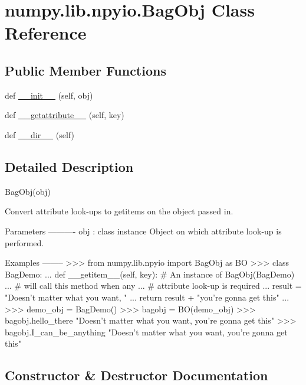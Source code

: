 \hypertarget{classnumpy_1_1lib_1_1npyio_1_1BagObj}{}\section{numpy.\+lib.\+npyio.\+Bag\+Obj Class Reference}
\label{classnumpy_1_1lib_1_1npyio_1_1BagObj}
\subsection*{Public Member Functions}
\begin{DoxyCompactItemize}
\item 
def \hyperlink{classnumpy_1_1lib_1_1npyio_1_1BagObj_a3945c91157103a4bd94288aff11cf65c}{\+\_\+\+\_\+init\+\_\+\+\_\+} (self, obj)
\item 
def \hyperlink{classnumpy_1_1lib_1_1npyio_1_1BagObj_aa6a98ffbeeebe6a1eb8d8a214cceaf8a}{\+\_\+\+\_\+getattribute\+\_\+\+\_\+} (self, key)
\item 
def \hyperlink{classnumpy_1_1lib_1_1npyio_1_1BagObj_aaa00f6ebdb940c991b9d28585f808854}{\+\_\+\+\_\+dir\+\_\+\+\_\+} (self)
\end{DoxyCompactItemize}


\subsection{Detailed Description}
\begin{DoxyVerb}BagObj(obj)

Convert attribute look-ups to getitems on the object passed in.

Parameters
----------
obj : class instance
    Object on which attribute look-up is performed.

Examples
--------
>>> from numpy.lib.npyio import BagObj as BO
>>> class BagDemo:
...     def __getitem__(self, key): # An instance of BagObj(BagDemo)
...                                 # will call this method when any
...                                 # attribute look-up is required
...         result = "Doesn't matter what you want, "
...         return result + "you're gonna get this"
...
>>> demo_obj = BagDemo()
>>> bagobj = BO(demo_obj)
>>> bagobj.hello_there
"Doesn't matter what you want, you're gonna get this"
>>> bagobj.I_can_be_anything
"Doesn't matter what you want, you're gonna get this"\end{DoxyVerb}
 

\subsection{Constructor \& Destructor Documentation}
\mbox{\label{classnumpy_1_1lib_1_1npyio_1_1BagObj_a3945c91157103a4bd94288aff11cf65c}} 
